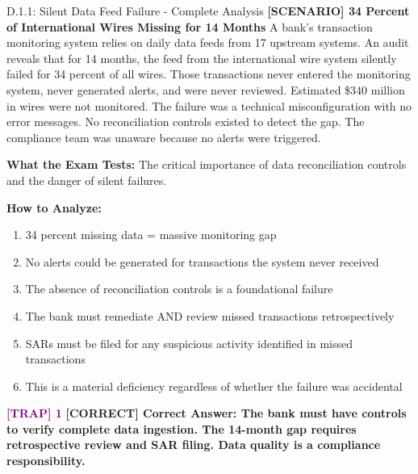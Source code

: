 \documentclass[11pt,a4paper]{beamer}
\newcommand{\trap}[1]{\textcolor{purple}{\textbf{[TRAP] 1}}}
\newcommand{\correct}[1]{\textcolor{green!50!black}{\textbf{[CORRECT] #1}}}
\newcommand{\scenario}[1]{\textcolor{blue!70!black}{\textbf{[SCENARIO] #1}}}
\begin{document}
\begin{frame}{D.1.1: Silent Data Feed Failure - Complete Analysis}
	\scenario{34 Percent of International Wires Missing for 14 Months}
	A bank's transaction monitoring system relies on daily data feeds from 17 upstream systems. An audit reveals that for 14 months, the feed from the international wire system silently failed for 34 percent of all wires. Those transactions never entered the monitoring system, never generated alerts, and were never reviewed. Estimated \$340 million in wires were not monitored. The failure was a technical misconfiguration with no error messages. No reconciliation controls existed to detect the gap. The compliance team was unaware because no alerts were triggered.
	
	\vspace{0.1cm}
	\textbf{What the Exam Tests:} The critical importance of data reconciliation controls and the danger of silent failures.
	
	\vspace{0.1cm}
	\textbf{How to Analyze:}
	\begin{enumerate}
		\item 34 percent missing data = massive monitoring gap
		\item No alerts could be generated for transactions the system never received
		\item The absence of reconciliation controls is a foundational failure
		\item The bank must remediate AND review missed transactions retrospectively
		\item SARs must be filed for any suspicious activity identified in missed transactions
		\item This is a material deficiency regardless of whether the failure was accidental
	\end{enumerate}
	
	\trap{Common Distractor: "The misconfiguration was accidental, so no compliance violation occurred."}
	\correct{Correct Answer: The bank must have controls to verify complete data ingestion. The 14-month gap requires retrospective review and SAR filing. Data quality is a compliance responsibility.}
\end{frame}
\end{document}
